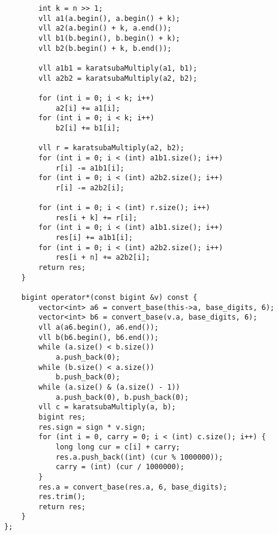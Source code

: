 \documentclass[a4paper,12pt]{report}
\begin{document}
\begin{lstlisting}
        int k = n >> 1;
        vll a1(a.begin(), a.begin() + k);
        vll a2(a.begin() + k, a.end());
        vll b1(b.begin(), b.begin() + k);
        vll b2(b.begin() + k, b.end());

        vll a1b1 = karatsubaMultiply(a1, b1);
        vll a2b2 = karatsubaMultiply(a2, b2);

        for (int i = 0; i < k; i++)
            a2[i] += a1[i];
        for (int i = 0; i < k; i++)
            b2[i] += b1[i];

        vll r = karatsubaMultiply(a2, b2);
        for (int i = 0; i < (int) a1b1.size(); i++)
            r[i] -= a1b1[i];
        for (int i = 0; i < (int) a2b2.size(); i++)
            r[i] -= a2b2[i];

        for (int i = 0; i < (int) r.size(); i++)
            res[i + k] += r[i];
        for (int i = 0; i < (int) a1b1.size(); i++)
            res[i] += a1b1[i];
        for (int i = 0; i < (int) a2b2.size(); i++)
            res[i + n] += a2b2[i];
        return res;
    }

    bigint operator*(const bigint &v) const {
        vector<int> a6 = convert_base(this->a, base_digits, 6);
        vector<int> b6 = convert_base(v.a, base_digits, 6);
        vll a(a6.begin(), a6.end());
        vll b(b6.begin(), b6.end());
        while (a.size() < b.size())
            a.push_back(0);
        while (b.size() < a.size())
            b.push_back(0);
        while (a.size() & (a.size() - 1))
            a.push_back(0), b.push_back(0);
        vll c = karatsubaMultiply(a, b);
        bigint res;
        res.sign = sign * v.sign;
        for (int i = 0, carry = 0; i < (int) c.size(); i++) {
            long long cur = c[i] + carry;
            res.a.push_back((int) (cur % 1000000));
            carry = (int) (cur / 1000000);
        }
        res.a = convert_base(res.a, 6, base_digits);
        res.trim();
        return res;
    }
};
\end{lstlisting}
\end{document}
